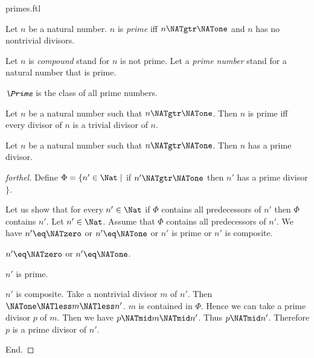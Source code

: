 \documentclass{naproche-library}
\begin{document}
\begin{smodule}[title=Prime Numbers]{primes.ftl}

\begin{definition}[forthel,id=ARITHMETIC_10_5450464558579712]
  Let $n$ be a natural number.
  $n$ is \emph{prime} iff $n \NATgtr \NATone$ and $n$ has no nontrivial divisors.

  Let $n$ is \emph{compound} stand for $n$ is not prime.
  Let a \emph{prime number} stand for a natural number that is prime.
\end{definition}

\begin{definition}[forthel,id=ARITHMETIC_10_3834705971511296]
  $\emph{\Prime}$ is the class of all prime numbers.
\end{definition}

\begin{proposition}[forthel,id=ARITHMETIC_10_7801379464675328]
  Let $n$ be a natural number such that $n \NATgtr \NATone$.
  Then $n$ is prime iff every divisor of $n$ is a trivial divisor of $n$.
\end{proposition}

\begin{proposition}[forthel,id=ARITHMETIC_10_3606185106210816]
  Let $n$ be a natural number such that $n \NATgtr \NATone$.
  Then $n$ has a prime divisor.
\end{proposition}
\begin{proof}[forthel]
  Define $\Phi = \{ n' \in \Nat \mid$ if $n' \NATgtr \NATone$ then $n'$ has a prime divisor $\}$.

  Let us show that for every $n' \in \Nat$ if $\Phi$ contains all
  predecessors of $n'$ then $\Phi$ contains $n'$.
    Let $n' \in \Nat$.
    Assume that $\Phi$ contains all predecessors of $n'$.
    We have $n' \eq \NATzero$ or $n' \eq \NATone$ or $n'$ is prime or $n'$ is composite.

    \begin{case}{$n' \eq \NATzero$ or $n' \eq \NATone$.} \end{case}

    \begin{case}{$n'$ is prime.} \end{case}

    \begin{case}{$n'$ is composite.}
      Take a nontrivial divisor $m$ of $n'$.
      Then $\NATone \NATless m \NATless n'$.
      $m$ is contained in $\Phi$.
      Hence we can take a prime divisor $p$ of $m$.
      Then we have $p \NATmid m \NATmid n'$.
      Thus $p \NATmid n'$.
      Therefore $p$ is a prime divisor of $n'$.
    \end{case}
  End.


\end{proof}
\end{smodule}
\end{document}
